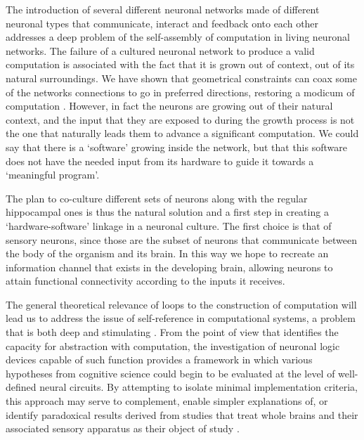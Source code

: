 The introduction of several different neuronal networks made of different neuronal types that communicate, interact and feedback onto each other addresses a deep problem of the self-assembly of computation in living neuronal networks. The failure of a cultured neuronal network to produce a valid computation is associated with the fact that it is grown out of context, out of its natural surroundings. We have shown that geometrical constraints can coax some of the networks connections to go in preferred directions, restoring a modicum of computation \cite{Feinerman2008}. However, in fact the neurons are growing out of their natural context, and the input that they are exposed to during the growth process is not the one that naturally leads them to advance a significant computation. We could say that there is a `software' growing inside the network, but that this software does not have the needed input from its hardware to guide it towards a ‘meaningful program’. 

The plan to co-culture different sets of neurons along with the regular hippocampal ones is thus the natural solution and a first step in creating a ‘hardware-software’ linkage in a neuronal culture. The first choice is that of sensory neurons, since those are the subset of neurons that communicate between the body of the organism and its brain. In this way we hope to recreate an information channel that exists in the developing brain, allowing neurons to attain functional connectivity according to the inputs it receives.

The general theoretical relevance of loops to the construction of computation will lead us to address the issue of self-reference in computational systems, a problem that is both deep and stimulating \cite{Levary2012}. From the point of view that identifies the capacity for abstraction with computation, the investigation of neuronal logic devices capable of such function provides a framework in which various hypotheses from cognitive science could begin to be evaluated at the level of well-defined neural circuits. By attempting to isolate minimal implementation criteria, this approach may serve to complement, enable simpler explanations of, or identify paradoxical results derived from studies that treat whole brains and their associated sensory apparatus as their object of study \cite{McClelland2010,Griffiths2010}.

